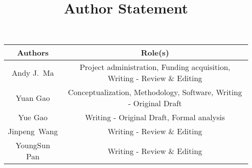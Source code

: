 \documentclass[preprint,3p,times]{elsarticle}
\begin{document}
\begin{frontmatter}
  \title{Author Statement}
\end{frontmatter}

\renewcommand{\figurename}[1]{Fig.#1}

\newcommand\emmax[1]{\textcolor{red}{\textbf{#1}}}
\newcommand\methodyear[1]{\textcolor{blue}{#1}}
\newcommand\Tstrut{\rule{0pt}{2.6ex}}
\newcommand\Bstrut{\rule[-0.9ex]{0pt}{0pt}}

\newcommand{\centeritem}[1]{\noindent\parbox[c]{\hsize}{\footnotesize \vspace*{1mm} #1 \vspace*{1mm}}}

\begin{table}[htb]
  \renewcommand{\arraystretch}{1.3}
  \label{table: logical}
  \centering
  \small
  \begin{tabularx}{0.75\textwidth}{c|c}
    \toprule[0.8pt]
    \textbf{\small Authors } & \textbf{\small Role(s)}                                                  \\
    \bottomrule[0.8pt]
    Andy J.~Ma               & Project administration, Funding acquisition, Writing - Review \& Editing \\
    Yuan Gao                 & Conceptualization, Methodology, Software, Writing - Original Draft       \\
    Yue Gao                  & Writing - Original Draft, Formal analysis                                \\
    Jinpeng~Wang             & Writing - Review \& Editing                                              \\
    YoungSun Pan             & Writing - Review \& Editing                                              \\
    \bottomrule[0.8pt]
  \end{tabularx}
\end{table}

% 
% 



\end{document}

